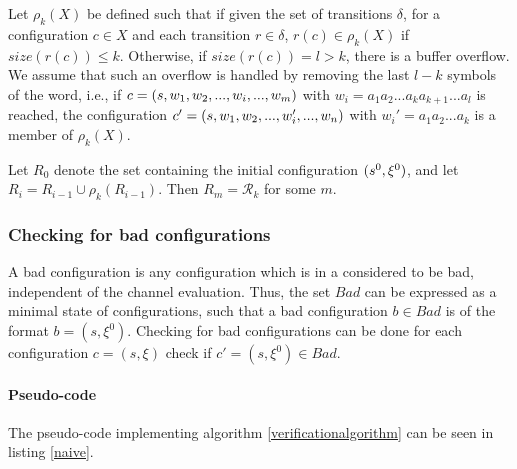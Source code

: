 Let $\rho_k(X)$ be defined such that if given the set of transitions $\delta$, for a configuration $c \in X$ and each transition $r \in \delta$, $r(c) \in \rho_k(X)$ if $size(r(c)) \leq k$. Otherwise, if $size(r(c)) = l > k$, there is a buffer overflow. We assume that such an overflow is handled by removing the last $l-k$ symbols of the word, i.e., if $c = (s, w_1, w_2,..., w_i, ...,  w_m)$ with $w_i = a_1a_2...a_ka_{k+1}...a_l$ is reached, the configuration $c' = (s, w_1, w_2, ..., w_i', ..., w_n)$ with $w_i' = a_1a_2...a_k$ is a member of $\rho_k(X)$.

Let $R_0$ denote the set containing the initial configuration $(s^0, \xi^0)$, and let $R_i = R_{i-1} \cup \rho_k(R_{i-1})$. Then $R_m = \mathcal{R}_k$ for some $m$.

\subsubsection{Checking for bad configurations}
\label{part3}
A bad configuration is any configuration which is in a  considered to be bad, independent of the channel evaluation. Thus, the set $Bad$ can be expressed as a minimal state of configurations, such that a bad configuration $b \in Bad$ is of the format $b = (s, \xi^0)$. Checking for bad configurations can be done for each configuration $c = (s, \xi)$ check if $c' = (s, \xi^0) \in Bad$.


\paragraph{Pseudo-code}
The pseudo-code implementing algorithm \ref{verificationalgorithm} can be seen in listing \ref{naive}. 

